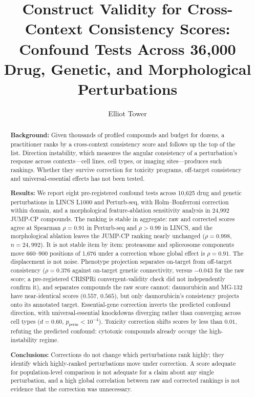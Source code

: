 \documentclass[11pt]{article}
\title{Construct Validity for Cross-Context Consistency Scores:\\ Confound Tests Across 36,000 Drug, Genetic, and Morphological Perturbations}
\author{Elliot Tower}
\affil{\texttt{elliot@elliottower.ai}}
\date{}
\begin{document}
\maketitle

\begin{abstract}
\textbf{Background:}
Given thousands of profiled compounds and budget for dozens, a practitioner
ranks by a cross-context consistency score and follows up the top of the
list. Direction instability, which measures the angular consistency of a
perturbation's response across contexts---cell lines, cell types, or
imaging sites---produces such rankings.
Whether they survive correction for toxicity programs, off-target
consistency and universal-essential effects has not been tested.

\textbf{Results:}
We report eight pre-registered confound tests across 10{,}625 drug and
genetic perturbations in LINCS L1000 and Perturb-seq, with
Holm--Bonferroni correction within domain, and a morphological
feature-ablation sensitivity analysis in 24{,}992 JUMP-CP compounds.
The ranking is stable in aggregate: raw and corrected scores agree at
Spearman $\rho = 0.91$ in Perturb-seq and $\rho > 0.99$ in LINCS, and the
morphological ablation leaves the JUMP-CP ranking nearly unchanged
($\rho = 0.998$, $n = 24{,}992$). It is
not stable item by item: proteasome and spliceosome components move
660--900 positions of 1{,}676 under a correction whose global effect is
$\rho = 0.91$. The displacement is not noise. Phenotype projection
separates on-target from off-target consistency ($\rho = 0.376$ against
on-target genetic connectivity, versus $-0.043$ for the raw score; a
pre-registered CRISPRi convergent-validity check did not independently
confirm it), and separates compounds the raw score cannot: daunorubicin and MG-132 have
near-identical scores ($0.557$, $0.565$), but only daunorubicin's
consistency projects onto its annotated target. Essential-gene correction
inverts the predicted confound direction, with universal-essential
knockdowns diverging rather than converging across cell types ($d = 0.60$,
$p_{\text{perm}} < 10^{-4}$). Toxicity correction shifts scores by less
than $0.01$, refuting the predicted confound: cytotoxic compounds already
occupy the high-instability regime.

\textbf{Conclusions:}
Corrections do not change which perturbations rank highly; they identify
which highly-ranked perturbations move under correction. A score adequate
for population-level comparison is not adequate for a claim about any
single perturbation, and a high global correlation between raw
and corrected rankings is not evidence that the correction was
unnecessary.
\end{abstract}
\end{document}
